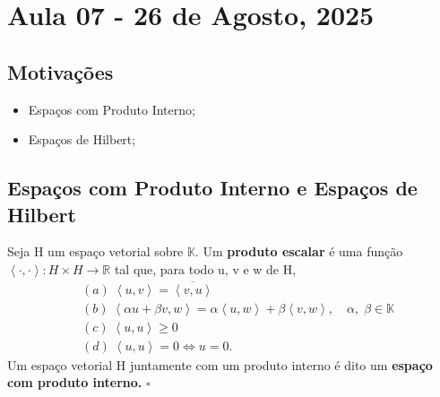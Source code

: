 \documentclass[../functional_analysis.tex]{subfiles}
\begin{document}
\section{Aula 07 - 26 de Agosto, 2025}
\subsection{Motivações}
\begin{itemize}
	\item Espaços com Produto Interno;
	\item Espaços de Hilbert;
\end{itemize}
\subsection{Espaços com Produto Interno e Espaços de Hilbert}
\begin{def*}
	Seja H um espaço vetorial sobre \(\mathbb{K}.\) Um \textbf{produto escalar} é uma função \(\left< \cdot , \cdot  \right>: H\times H\rightarrow \mathbb{R}\) tal que, para todo u, v e w de H,
	\begin{align*}
		 & (a)\; \left< u, v \right> = \overline{\left< v, u \right>}                                                                                \\
		 & (b)\; \left< \alpha u + \beta v, w \right> = \alpha \left< u, w \right> + \beta \left< v, w \right>, \quad \alpha,\; \beta \in \mathbb{K} \\
		 & (c)\; \left< u, u \right>\geq 0                                                                                                           \\
		 & (d)\; \left< u, u \right> = 0 \Longleftrightarrow u = 0.
	\end{align*}
	Um espaço vetorial H juntamente com um produto interno é dito um \textbf{espaço com produto interno.} \(\square\)
\end{def*}
\end{document}
